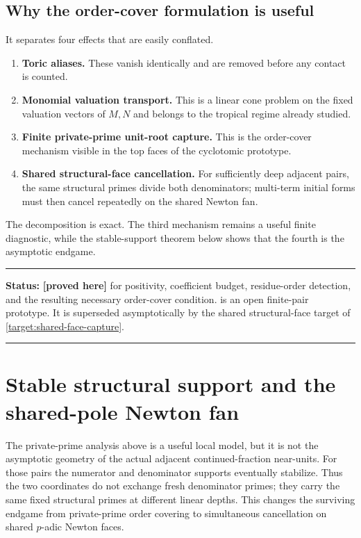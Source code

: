 \documentclass[11pt,oneside]{article}
\theoremstyle{definition}
\theoremstyle{remark}
\newcommand{\statusproved}{\textcolor{provedgreen}{\textbf{[proved here]}}}
\newenvironment{statusbox}[1]
{\begin{center}\begin{minipage}{0.94\textwidth}\raggedright\hrule\vspace{0.45em}
\textbf{Status:} #1\par\vspace{0.35em}}
{\vspace{0.35em}\hrule\end{minipage}\end{center}}
\begin{document}
\subsection{Why the order-cover formulation is useful}

It separates four effects that are easily conflated.

\begin{enumerate}
\item \textbf{Toric aliases.}  These vanish identically and are removed before any contact is
  counted.
\item \textbf{Monomial valuation transport.}  This is a linear cone problem on the fixed
  valuation vectors of $M,N$ and belongs to the tropical regime already studied.
\item \textbf{Finite private-prime unit-root capture.}  This is the order-cover mechanism
  visible in the top faces of the cyclotomic prototype.
\item \textbf{Shared structural-face cancellation.}  For sufficiently deep adjacent pairs,
  the same structural primes divide both denominators; multi-term initial forms must then
  cancel repeatedly on the shared Newton fan.
\end{enumerate}

The decomposition is exact.  The third mechanism remains a useful finite diagnostic, while
the stable-support theorem below shows that the fourth is the asymptotic endgame.

\begin{statusbox}{\statusproved{} for positivity, coefficient budget, residue-order
detection, and the resulting necessary order-cover condition.  \Cref{target:deep-order-cover}
is an open finite-pair prototype.  It is superseded asymptotically by the shared structural-face
target of \cref{target:shared-face-capture}.}
\end{statusbox}

\section{Stable structural support and the shared-pole Newton fan}
\label{sec:stable-support}

The private-prime analysis above is a useful local model, but it is not the asymptotic
geometry of the actual adjacent continued-fraction near-units.  For those pairs the numerator
and denominator supports eventually stabilize.  Thus the two coordinates do not exchange
fresh denominator primes; they carry the same fixed structural primes at different linear
depths.  This changes the surviving endgame from private-prime order covering to simultaneous
cancellation on shared $p$-adic Newton faces.
\end{document}

